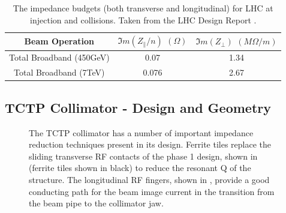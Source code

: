 \begin{table}
\caption{The impedance budgets (both transverse and longitudinal) for LHC at injection and collisions. Taken from the LHC Design Report \cite{Ruggiero:LHCColEff}.}
\begin{center}
\begin{tabular}{c | c | c}
Beam Operation & $\Im{}m ( Z_{\parallel}/n )$ $( \Omega )$ & $\Im{}m ( Z_{\perp} )$ $(M \Omega /m )$\\ \hline
Total Broadband (450GeV) & 0.07 & 1.34 \\ \hline
Total Broadband (7TeV) & 0.076 & 2.67 \\ \hline
\end{tabular}
\end{center}
\label{tab:lhc-impedance-budget}
\end{table}

\subsection{TCTP Collimator - Design and Geometry}

\begin{figure}
\caption{The TCTP collimator has a number of important impedance reduction techniques present in its design. Ferrite tiles replace the sliding transverse RF contacts of the phase 1 design, shown in  (ferrite tiles shown in black) to reduce the resonant Q of the structure. The longitudinal RF fingers, shown in , provide a good conducting path for the beam image current in the transition from the beam pipe to the collimator jaw.}
\label{fig:tctp-figure}
\end{figure}

